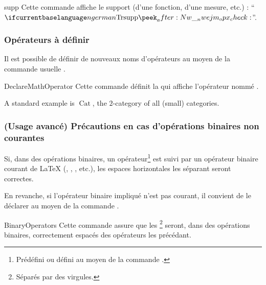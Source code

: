 \documentclass[french,nolocaltoc]{nwejmart}
\newtheorem[title=Fait,style=definition]{fact}
\DeclareMathOperator{\cat}{Cat}
\begin{document}
\begin{docCommand}{supp}{}
  Cette commande affiche le support (d'une fonction, d'une mesure, etc.) :
  \enquote{$\supp$}.
\end{docCommand}

\subsubsection{Opérateurs à définir}

Il est possible de définir de nouveaux noms d'opérateurs au moyen de la commande
usuelle .

\begin{docCommand}{DeclareMathOperator}{}
  Cette commande définit la  qui affiche l'opérateur nommé
  .
\end{docCommand}

\begin{preamblecode}
\DeclareMathOperator{\cat}{Cat}
\end{preamblecode}
\begin{bodycode}[listing and text,listing options={deletekeywords={[1]{example}},deletekeywords={[2]{all}}}]
A standard example is $\cat$, the $2$-category of all (small)
categories.
\end{bodycode}

\subsubsection{(Usage avancé) Précautions en cas d'opérations binaires non
  courantes}

Si, dans des opérations binaires, un opérateur\footnote{Prédéfini ou défini au
  moyen de la commande \protect{}.} est suivi par un
opérateur binaire courant de \LaTeX{} (,
, , etc.), les espaces horizontales les
séparant seront correctes.

En revanche, si l'opérateur binaire impliqué n'est pas courant, il convient de
le déclarer au moyen de la commande .

\begin{docCommand}{BinaryOperators}{}
  Cette commande assure que les \footnote{Séparés par
    des virgules.} seront, dans des opérations binaires, correctement espacés
  des opérateurs les précédant.
\end{docCommand}
\end{document}

